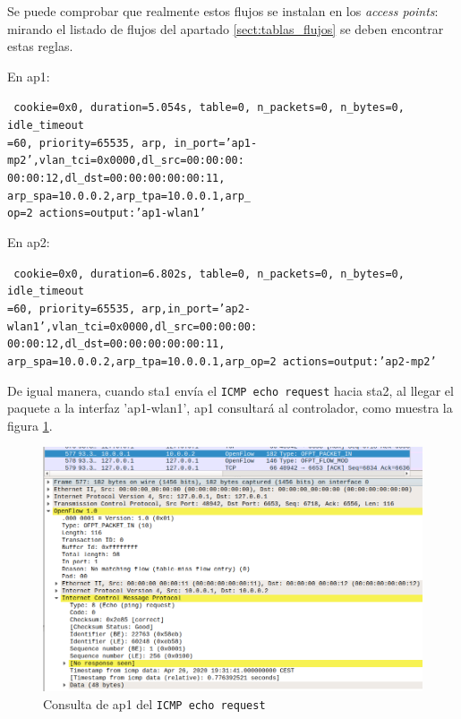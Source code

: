 \documentclass[a4paper,12pt,twoside,spanish]{book}
\begin{document}
Se puede comprobar que realmente estos flujos se instalan en los \textit{access points}: mirando el listado de flujos del apartado \ref{sect:tablas_flujos} se deben encontrar estas reglas.\par

En ap1:\par 

\noindent\texttt{
	cookie=0x0, duration=5.054s, table=0, n\_packets=0, n\_bytes=0, idle\_timeout\\
	=60, priority=65535, arp,
	in\_port='ap1-mp2',vlan\_tci=0x0000,dl\_src=00:00:00:\\
	00:00:12,dl\_dst=00:00:00:00:00:11,
	arp\_spa=10.0.0.2,arp\_tpa=10.0.0.1,arp\_\\
	op=2 actions=output:'ap1-wlan1'
}

En ap2:\par 

\noindent\texttt{
	cookie=0x0, duration=6.802s, table=0, n\_packets=0, n\_bytes=0, idle\_timeout\\
	=60, priority=65535,
	arp,in\_port='ap2-wlan1',vlan\_tci=0x0000,dl\_src=00:00:00:\\
	00:00:12,dl\_dst=00:00:00:00:00:11,
	arp\_spa=10.0.0.2,arp\_tpa=10.0.0.1,arp\_op=2 actions=output:'ap2-mp2'
}

De igual manera, cuando sta1 envía el \texttt{ICMP echo request} hacia sta2, al llegar el paquete a la interfaz 'ap1-wlan1', ap1 consultará al controlador, como muestra la figura \ref{fig:capt_6}.\par 
	
	\begin{figure}[!h]
		\centering
		\includegraphics[scale=0.4]{Figuras/capt_6.png}
		\caption{Consulta de ap1 del \texttt{ICMP echo request}}
		\label{fig:capt_6}
	\end{figure}
\end{document}
